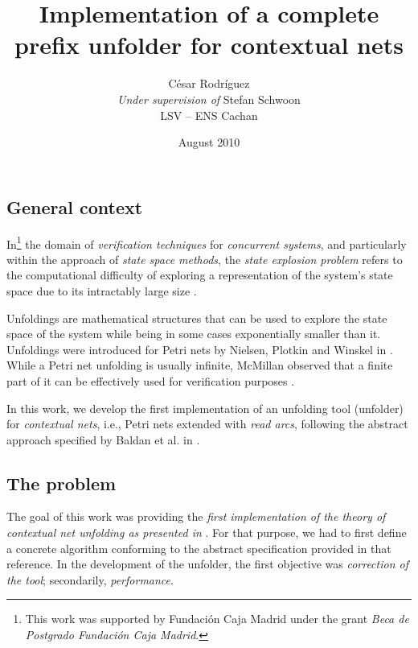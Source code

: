 \documentclass[11pt,a4paper]{article}
\begin{document}
\title{Implementation of a complete prefix unfolder for contextual nets}

\author{César Rodríguez\\[1ex]\textit{Under supervision of} Stefan Schwoon\\[1em]LSV -- ENS Cachan}
\date{August 2010}

\maketitle
\thispagestyle{empty}

\subsection*{General context}

In\footnote{This work was supported by Fundación Caja Madrid under the grant
\emph{Beca de Postgrado Fundación Caja Madrid}.} the domain of
\emph{verification techniques} for \emph{concurrent systems}, and particularly
within the approach of \emph{state space methods}, the \emph{state explosion
problem} refers to the computational difficulty of exploring a representation
of the system's state space due to its intractably large size .

Unfoldings are mathematical structures that can be used to explore the state
space of the system while being in some cases exponentially smaller than it.
Unfoldings were introduced for Petri nets by Nielsen, Plotkin and Winskel in
.  While a Petri net unfolding is usually infinite, McMillan
observed that a finite part of it can be effectively used for verification
purposes .

In this work, we develop the first implementation of an unfolding tool
(unfolder) for \emph{contextual nets}, i.e., Petri nets extended with
\emph{read arcs}, following the abstract approach specified by Baldan et al. in
.

\subsection*{The problem}

The goal of this work was providing the \emph{first implementation of the
theory of contextual net unfolding as presented in }.  For that
purpose, we had to first define a concrete algorithm conforming to the abstract
specification provided in that reference.  In the development of the unfolder,
the first objective was \emph{correction of the tool}; secondarily,
\emph{performance}.
\end{document}
